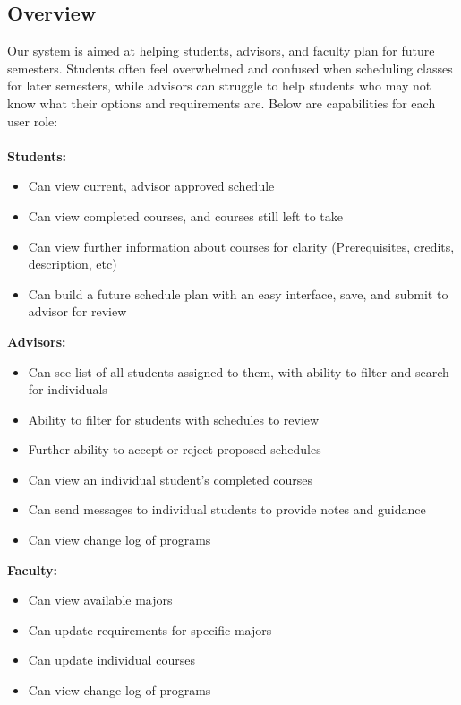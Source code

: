 \documentclass[12pt,letterpaper]{article}
\begin{document}
\subsection{Overview}

Our system is aimed at helping students, advisors, and faculty plan for future semesters. Students often feel overwhelmed and confused when scheduling classes for later semesters, while advisors can struggle to help students who may not know what their options and requirements are. Below are capabilities for each user role:\\\\
\textbf{Students:}
\begin{itemize}
    \item Can view current, advisor approved schedule
    \item Can view completed courses, and courses still left to take
    \item Can view further information about courses for clarity (Prerequisites, credits, description, etc)
    \item Can build a future schedule plan with an easy interface, save, and submit to advisor for review
\end{itemize}

\noindent \textbf{Advisors:}
\begin{itemize}
    \item Can see list of all students assigned to them, with ability to filter and search for individuals
    \item Ability to filter for students with schedules to review
    \item Further ability to accept or reject proposed schedules
    \item Can view an individual student's completed courses
    \item Can send messages to individual students to provide notes and guidance
    \item Can view change log of programs
\end{itemize}

\noindent \textbf{Faculty:}
\begin{itemize}
    \item Can view available majors
    \item Can update requirements for specific majors
    \item Can update individual courses
    \item Can view change log of programs
\end{itemize}
\end{document}
